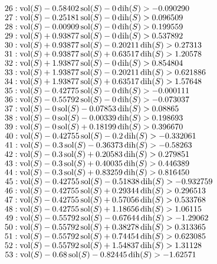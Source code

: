 $26:  \vol(S) - 0.58402 \sol(S) - 0 \dih(S) > -0.090290$\newline
$27:  \vol(S) - 0.25181 \sol(S) - 0 \dih(S) > 0.096509$\newline
$28:  \vol(S) - 0.00909 \sol(S) - 0 \dih(S) > 0.199559$\newline
$29:  \vol(S) + 0.93877 \sol(S) - 0 \dih(S) > 0.537892$\newline
$30:  \vol(S) + 0.93877 \sol(S) - 0.20211 \dih(S) > 0.27313$\newline
$31:  \vol(S) + 0.93877 \sol(S) + 0.63517 \dih(S) > 1.20578$\newline
$32:  \vol(S) + 1.93877 \sol(S) - 0 \dih(S) > 0.854804$\newline
$33:  \vol(S) + 1.93877 \sol(S) - 0.20211 \dih(S) > 0.621886$\newline
$34:  \vol(S) + 1.93877 \sol(S) + 0.63517 \dih(S) > 1.57648$\newline
$35:  \vol(S) - 0.42775 \sol(S) - 0 \dih(S) > -0.000111$\newline
$36:  \vol(S) - 0.55792 \sol(S) - 0 \dih(S) > -0.073037$\newline
$37:  \vol(S) - 0 \sol(S) - 0.07853 \dih(S) > 0.08865$\newline
$38:  \vol(S) - 0 \sol(S) - 0.00339 \dih(S) > 0.198693$\newline
$39:  \vol(S) - 0 \sol(S) + 0.18199 \dih(S) > 0.396670$\newline
$40:  \vol(S) - 0.42755 \sol(S) - 0.2 \dih(S) > -0.332061$\newline
$41:  \vol(S) - 0.3 \sol(S) - 0.36373 \dih(S) > -0.58263$\newline
$42:  \vol(S) - 0.3 \sol(S) + 0.20583 \dih(S) > 0.279851$\newline
$43:  \vol(S) - 0.3 \sol(S) + 0.40035 \dih(S) > 0.446389$\newline
$44:  \vol(S) - 0.3 \sol(S) + 0.83259 \dih(S) > 0.816450$\newline
$45:  \vol(S) - 0.42755 \sol(S) - 0.51838 \dih(S) > -0.932759$\newline
$46:  \vol(S) - 0.42755 \sol(S) + 0.29344 \dih(S) > 0.296513$\newline
$47:  \vol(S) - 0.42755 \sol(S) + 0.57056 \dih(S) > 0.533768$\newline
$48:  \vol(S) - 0.42755 \sol(S) + 1.18656 \dih(S) > 1.06115$\newline
$49:  \vol(S) - 0.55792 \sol(S) - 0.67644 \dih(S) > -1.29062$\newline
$50:  \vol(S) - 0.55792 \sol(S) + 0.38278 \dih(S) > 0.313365$\newline
$51:  \vol(S) - 0.55792 \sol(S) + 0.74454 \dih(S) > 0.623085$\newline
$52:  \vol(S) - 0.55792 \sol(S) + 1.54837 \dih(S) > 1.31128$\newline
$53:  \vol(S) - 0.68 \sol(S) - 0.82445 \dih(S) > -1.62571$\newline
\smallskip

